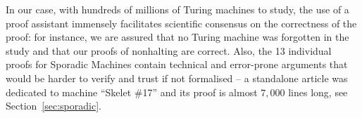 \documentclass[sigconf,screen]{acmart}
\theoremstyle{definition} %
\numberwithin{equation}{section}
\theoremstyle{definition} %
\newcommand{\CoqBB}{Coq-BB5\xspace}
\begin{document}


In our case, with hundreds of millions of Turing machines to study, the use of a proof assistant immensely facilitates scientific consensus on the correctness of the proof: for instance, we are assured that no Turing machine was forgotten in the study and that our proofs of nonhalting are correct. Also, the 13 individual proofs for Sporadic Machines contain technical and error-prone arguments that would be harder to verify and trust if not formalised -- \eg a standalone article was dedicated to machine ``Skelet \#17'' \cite{xu2024skelet17fifthbusy} and its \Coq proof is almost $7{,}000$ lines long, see Section~\ref{sec:sporadic}.

\end{document}
